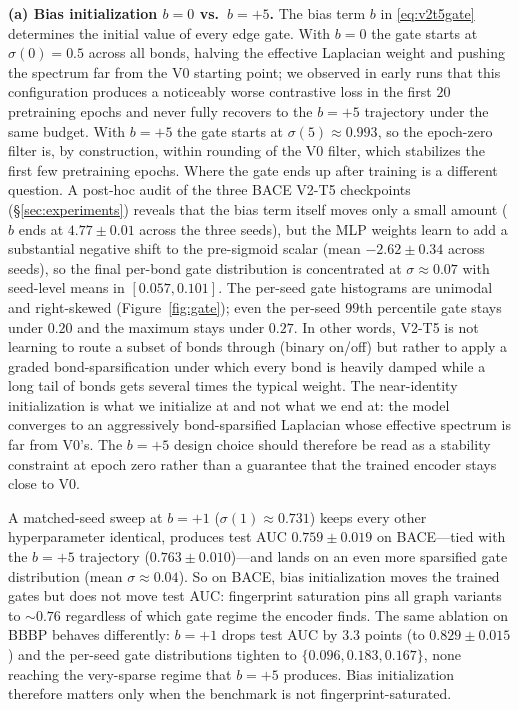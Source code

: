\documentclass[conference]{IEEEtran}
\begin{document}
\noindent\textbf{(a) Bias initialization $b{=}0$ vs.\ $b{=}{+}5$.}
The bias term $b$ in \eqref{eq:v2t5gate} determines the initial value of every edge gate. With $b{=}0$ the gate starts at $\sigma(0){=}0.5$ across all bonds, halving the effective Laplacian weight and pushing the spectrum far from the V0 starting point; we observed in early runs that this configuration produces a noticeably worse contrastive loss in the first $20$ pretraining epochs and never fully recovers to the $b{=}{+}5$ trajectory under the same budget. With $b{=}{+}5$ the gate starts at $\sigma(5)\approx 0.993$, so the epoch-zero filter is, by construction, within rounding of the V0 filter, which stabilizes the first few pretraining epochs. Where the gate ends up after training is a different question. A post-hoc audit of the three BACE V2-T5 checkpoints (\S\ref{sec:experiments}) reveals that the bias term itself moves only a small amount ($b$ ends at $4.77\pm 0.01$ across the three seeds), but the MLP weights learn to add a substantial negative shift to the pre-sigmoid scalar (mean $-2.62 \pm 0.34$ across seeds), so the final per-bond gate distribution is concentrated at $\sigma\approx 0.07$ with seed-level means in $[0.057, 0.101]$. The per-seed gate histograms are unimodal and right-skewed (Figure~\ref{fig:gate}); even the per-seed 99th percentile gate stays under $0.20$ and the maximum stays under $0.27$. In other words, V2-T5 is not learning to route a subset of bonds through (binary on/off) but rather to apply a graded bond-sparsification under which every bond is heavily damped while a long tail of bonds gets several times the typical weight. The near-identity initialization is what we initialize at and not what we end at: the model converges to an aggressively bond-sparsified Laplacian whose effective spectrum is far from V0's. The $b{=}{+}5$ design choice should therefore be read as a stability constraint at epoch zero rather than a guarantee that the trained encoder stays close to V0.

A matched-seed sweep at $b{=}{+}1$ ($\sigma(1)\approx 0.731$) keeps every other hyperparameter identical, produces test AUC $0.759 \pm 0.019$ on BACE---tied with the $b{=}{+}5$ trajectory ($0.763 \pm 0.010$)---and lands on an even more sparsified gate distribution (mean $\sigma\approx 0.04$). So on BACE, bias initialization moves the trained gates but does not move test AUC: fingerprint saturation pins all graph variants to $\sim$$0.76$ regardless of which gate regime the encoder finds. The same ablation on BBBP behaves differently: $b{=}{+}1$ drops test AUC by $3.3$ points (to $0.829 \pm 0.015$) and the per-seed gate distributions tighten to $\{0.096, 0.183, 0.167\}$, none reaching the very-sparse regime that $b{=}{+}5$ produces. Bias initialization therefore matters only when the benchmark is not fingerprint-saturated.
\end{document}
